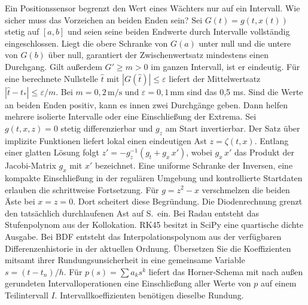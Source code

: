 
Ein Positionssensor begrenzt den Wert eines Wächters nur auf ein Intervall. Wie sicher muss das Vorzeichen an beiden Enden sein? Sei \(G(t)=g(t,x(t))\) stetig auf \([a,b]\) und seien seine beiden Endwerte durch Intervalle vollständig eingeschlossen. Liegt die obere Schranke von \(G(a)\) unter null und die untere von \(G(b)\) über null, garantiert der Zwischenwertsatz mindestens einen Durchgang. Gilt außerdem \(G'\ge m>0\) im ganzen Intervall, ist er eindeutig.
Für eine berechnete Nullstelle \(\hat t\) mit \(|G(\hat t)|\le\varepsilon\) liefert der Mittelwertsatz \(|\hat t-t_*|\le\varepsilon/m\). Bei \(m=0{,}2\,\mathrm{m/s}\) und \(\varepsilon=0{,}1\,\mathrm{mm}\) sind das 0,5 ms. Sind die Werte an beiden Enden positiv, kann es innen zwei Durchgänge geben. Dann helfen mehrere isolierte Intervalle oder eine Einschließung der Extrema.
Sei \(g(t,x,z)=0\) stetig differenzierbar und \(g_z\) am Start invertierbar. Der Satz über implizite Funktionen liefert lokal einen eindeutigen Ast \(z=\zeta(t,x)\). Entlang einer glatten Lösung folgt \(z'=-g_z^{-1}(g_t+g_x\,x')\), wobei \(g_x\,x'\) das Produkt der Jacobi-Matrix \(g_x\) mit \(x'\) bezeichnet. Eine uniforme Schranke der Inversen, eine kompakte Einschließung in der regulären Umgebung und kontrollierte Startdaten erlauben die schrittweise Fortsetzung. Für \(g=z^2-x\) verschmelzen die beiden Äste bei \(x=z=0\). Dort scheitert diese Begründung. Die Diodenrechnung grenzt den tatsächlich durchlaufenen Ast auf S.\, ein.
Bei Radau entsteht das Stufenpolynom aus der Kollokation. RK45 besitzt in SciPy eine quartische dichte Ausgabe. Bei BDF entsteht das Interpolationspolynom aus der verfügbaren Differenzenhistorie in der aktuellen Ordnung. Übersetzen Sie die Koeffizienten mitsamt ihrer Rundungsunsicherheit in eine gemeinsame Variable \(s=(t-t_n)/h\). Für \(p(s)=\sum a_ks^k\) liefert das Horner-Schema mit nach außen gerundeten Intervalloperationen eine Einschließung aller Werte von \(p\) auf einem Teilintervall \(I\). Intervallkoeffizienten benötigen dieselbe Rundung.
